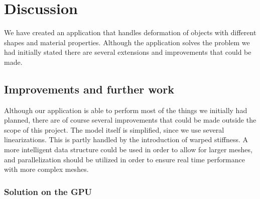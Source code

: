 \documentclass[10pt,a4paper]{article}
\begin{document}
\section{Discussion}
We have created an application that handles deformation of objects with different shapes and material properties. Although the application solves the problem we had initially stated there are several extensions and improvements that could be made.
\subsection{Improvements and further work}
Although our application is able to perform most of the things we initially had planned, there are of course several improvements that could be made outside the scope of this project. The model itself is simplified, since we use several linearizations. This is partly handled by the introduction of warped stiffness. A more intelligent data structure could be used in order to allow for larger meshes, and parallelization should be utilized in order to ensure real time performance with more complex meshes.
\subsubsection{Solution on the GPU}





\pagebreak
{}


\end{document}
